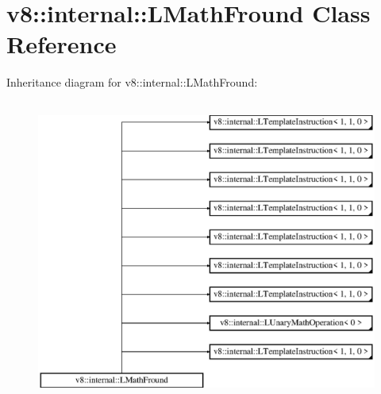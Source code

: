 \hypertarget{classv8_1_1internal_1_1_l_math_fround}{}\section{v8\+:\+:internal\+:\+:L\+Math\+Fround Class Reference}
\label{classv8_1_1internal_1_1_l_math_fround}
Inheritance diagram for v8\+:\+:internal\+:\+:L\+Math\+Fround\+:\begin{figure}[H]
\begin{center}
\leavevmode
\includegraphics[height=10.000000cm]{classv8_1_1internal_1_1_l_math_fround}
\end{center}
\end{figure}

